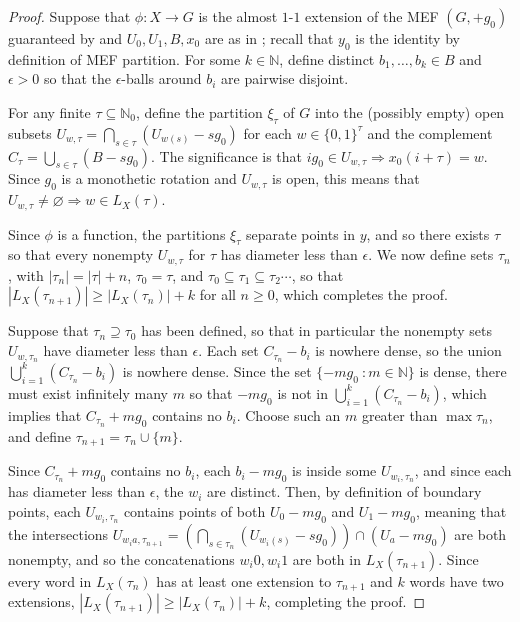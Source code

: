 \documentclass[11pt,reqno]{amsart}
\theoremstyle{definition}
\theoremstyle{plain}
\newcommand{\N}{\mathbb{N}}
\begin{document}
\begin{proof}
Suppose that $\phi: X \rightarrow G$ is the almost $1$-$1$ extension of the MEF $(G, +g_0)$ guaranteed by  and $U_0, U_1, B, x_0$ are as in 
; recall that $y_0$ is the identity by definition of MEF partition. For some $k \in \N$, define distinct $b_1, \ldots, b_k \in B$ and $\epsilon > 0$ so that the $\epsilon$-balls around $b_i$ are pairwise disjoint. 

For any finite $\tau \subseteq \N_0$, define the partition $\xi_{\tau}$ of $G$ into the (possibly empty) open subsets $U_{w,{\tau}} = \bigcap_{s \in {\tau}} (U_{w(s)} - sg_0)$ for each $w \in \{0,1\}^{\tau}$ and the complement $C_{\tau} = \bigcup_{s \in {\tau}} (B - sg_0)$. The significance is that
$ig_0 \in U_{w,\tau} \Longrightarrow x_0(i + \tau) = w$. Since $g_0$ is a monothetic rotation and $U_{w,\tau}$ is open, this means that $U_{w,{\tau}} \neq \varnothing \Longrightarrow w \in L_X({\tau})$. 

Since $\phi$ is a function, the partitions $\xi_{\tau}$ separate points in $y$, and so there exists ${\tau}$ so that
every nonempty $U_{w,{\tau}}$ for ${\tau}$ has diameter less than $\epsilon$. We now define sets ${\tau}_n$, with $|{\tau}_n| = |{\tau}| + n$, ${\tau}_0 = {\tau}$, and 
${\tau}_0 \subseteq {\tau}_1 \subseteq {\tau}_2 \cdots$, so that $|L_X({\tau}_{n+1})| \geq |L_X({\tau}_n)| + k$ for all $n \geq 0$, which completes the proof.

Suppose that ${\tau}_n \supseteq {\tau}_0$ has been defined, so that in particular the nonempty sets $U_{w,{\tau}_n}$ have diameter less than 
$\epsilon$. Each set $C_{{\tau}_n} - b_i$ is nowhere dense, so the union $\bigcup_{i=1}^k (C_{{\tau}_n} - b_i)$ is nowhere dense. Since the set $\{-mg_0 \ : m \in \N\}$ is dense, there must exist infinitely many $m$ so that $-mg_0$ is not in $\bigcup_{i=1}^k (C_{{\tau}_n} - b_i)$, which implies that $C_{{\tau}_n} + mg_0$ contains no $b_i$. Choose such an $m$ greater than $\max {\tau}_n$, and define ${\tau}_{n+1} = {\tau}_n \cup \{m\}$. 

Since $C_{{\tau}_n} + mg_0$ contains no $b_i$, each $b_i - mg_0$ is inside some $U_{w_i,{\tau}_n}$, and since each has diameter less than $\epsilon$, the $w_i$ are distinct. Then, by definition of boundary points, each $U_{w_i, {\tau}_n}$ contains points of both $U_0 - mg_0$ and $U_1 - mg_0$, meaning that the intersections $U_{w_i a,{\tau}_{n+1}} = \left(\bigcap_{s \in {\tau}_n} (U_{w_i(s)} - sg_0)\right) \cap (U_a - mg_0)$ are both nonempty, and so the concatenations $w_i 0, w_i 1$ are both in $L_X({\tau}_{n+1})$. Since every word in $L_X({\tau}_n)$ has at least one extension to ${\tau}_{n+1}$ and $k$ words have two extensions, $|L_X({\tau}_{n+1})| \geq |L_X({\tau}_n)| + k$, completing the proof.

\end{proof}
\end{document}
